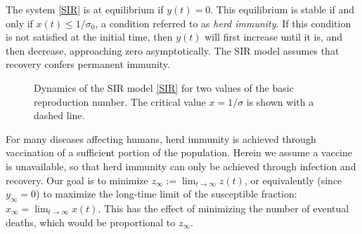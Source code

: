 \documentclass[english,12pt,letter]{article}
\newcommand{\Rnot}{\sigma_0}
\newcommand{\Sinf}{x_\infty}
\begin{document}
The system \eqref{SIR} is at equilibrium if $y(t)=0$.  This equilibrium is stable if and
only if $x(t)\le 1/\Rnot$, a condition referred to as {\em herd immunity}.  If
this condition is not satisfied at
the initial time, then $y(t)$ will first increase until it is, and then decrease,
approaching zero asymptotically.  The SIR model assumes that recovery
confers permanent immunity.

\begin{figure}
    \centering
    \caption{Dynamics of the SIR model \eqref{SIR} for two values of the basic reproduction number.
            The critical value $x=1/\sigma$ is shown with a dashed line.\label{fig:dynamics}}
\end{figure}

For many diseases affecting humans, herd immunity is achieved
through vaccination of a sufficient portion of the population.  Herein
we assume a vaccine is unavailable, so that herd immunity can only be achieved
through infection and recovery.
Our goal is to minimize $z_\infty := \lim_{t \to \infty} z(t)$, or equivalently
(since $y_\infty=0$)
to maximize the long-time limit of the susceptible fraction:
$\Sinf = \lim_{t\to\infty} x(t)$.
This has the effect of minimizing
the number of eventual deaths, which would be proportional to $z_\infty$.
\end{document}

